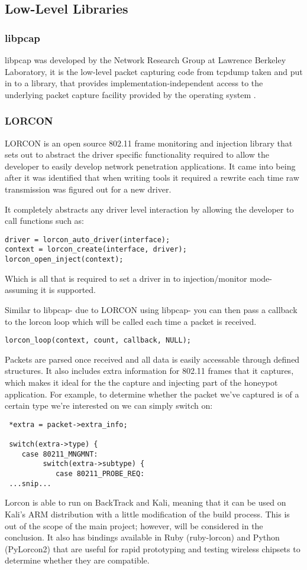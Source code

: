 \subsection{Low-Level Libraries}
\subsubsection{libpcap}
libpcap was developed by the Network Research Group at Lawrence Berkeley Laboratory, it is the low-level packet capturing code from tcpdump taken and put in to a library, that provides implementation-independent access to the underlying packet capture facility provided by the operating system \cite{research:network_programming}.  
\subsubsection{LORCON}
LORCON is an open source 802.11 frame monitoring and injection library that sets out to abstract the driver specific functionality required to allow the developer to easily develop network penetration applications. It came into being after it was identified that when writing tools it required a rewrite each time raw transmission was figured out for a new driver. 

It completely abstracts any driver level interaction by allowing the developer to call functions such as:

\begin{verbatim}
driver = lorcon_auto_driver(interface);
context = lorcon_create(interface, driver);
lorcon_open_inject(context);
\end{verbatim}

Which is all that is required to set a driver in to injection/monitor mode- assuming it is supported.

Similar to libpcap- due to LORCON using libpcap- you can then pass a callback to the lorcon loop which will be called each time a packet is received.

\begin{verbatim}
lorcon_loop(context, count, callback, NULL);
\end{verbatim}

Packets are parsed once received and all data is easily accessable through defined structures. It also includes extra information for 802.11 frames that it captures, which makes it ideal for the the capture and injecting part of the honeypot application. For example, to determine whether the packet we've captured is of a certain type we're interested on we can simply switch on:
\begin{verbatim}
 *extra = packet->extra_info;

 switch(extra->type) {
 	case 80211_MNGMNT:
 		 switch(extra->subtype) {
 		 	case 80211_PROBE_REQ:
 ...snip...
\end{verbatim}
Lorcon is able to run on BackTrack and Kali, meaning that it can be used on Kali's ARM distribution with a little modification of the build process. This is out of the scope of the main project; however, will be considered in the conclusion. It also has bindings available in Ruby (ruby-lorcon) and Python (PyLorcon2) that are useful for rapid prototyping and testing wireless chipsets to determine whether they are compatible.


